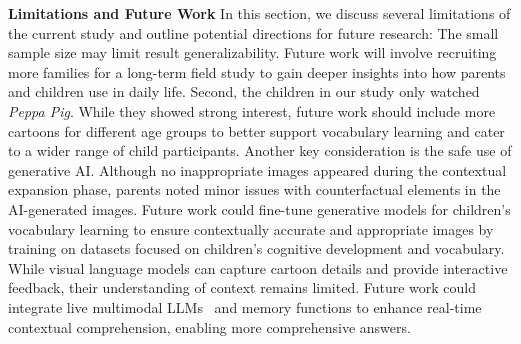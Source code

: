 \textbf{Limitations and Future Work} 
In this section, we discuss several limitations of the current study and outline potential directions for future research:
The small sample size may limit result generalizability. Future work will involve recruiting more families for a long-term field study to gain deeper insights into how parents and children use \name{} in daily life. Second, the children in our study only watched \textit{Peppa Pig}. While they showed strong interest, future work should include more cartoons for different age groups to better support vocabulary learning and cater to a wider range of child participants.
Another key consideration is the safe use of generative AI. Although no inappropriate images appeared during the contextual expansion phase, parents noted minor issues with counterfactual elements in the AI-generated images. Future work could fine-tune generative models for children's vocabulary learning to ensure contextually accurate and appropriate images by training on datasets focused on children's cognitive development and vocabulary.
While visual language models can capture cartoon details and provide interactive feedback, their understanding of context remains limited. Future work could integrate live multimodal LLMs~\cite{google_ai_studio} and memory functions to enhance real-time contextual comprehension, enabling more comprehensive answers.